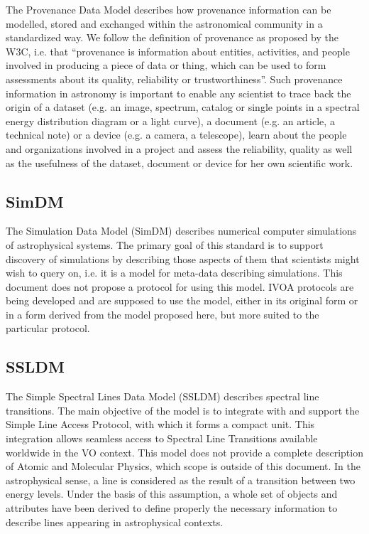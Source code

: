 \documentclass[11pt,letter]{ivoa}
\begin{document}
The Provenance Data Model \citep{2020ivoa.spec.0411S} describes how provenance information can be modelled, stored 
and exchanged within the astronomical community in a standardized way. We follow the 
definition of provenance as proposed by the W3C, i.e. that ``provenance is information 
about entities, activities, and people involved in producing a piece of data or thing, 
which can be used to form assessments about its quality, reliability or trustworthiness''.
Such provenance information in astronomy is important to enable any scientist to trace 
back the origin of a dataset (e.g. an image, spectrum, catalog or single points in a 
spectral energy distribution diagram or a light curve), a document (e.g. an article, a 
technical note) or a device (e.g. a camera, a telescope), learn about the people and 
organizations involved in a project and assess the reliability, quality as well as the 
usefulness of the dataset, document or device for her own scientific work. 

\subsection{SimDM}

The Simulation Data Model (SimDM) \citep{2012ivoa.spec.0503L} describes numerical computer simulations of astrophysical systems. 
The primary goal of this standard is to support discovery of simulations by describing those 
aspects of them that scientists might wish to query on, i.e. it is a model for meta-data 
describing simulations. This document does not propose a protocol for using this model. 
IVOA protocols are being developed and are supposed to use the model, either in its original 
form or in a form derived from the model proposed here, but more suited to the particular protocol. 

\subsection{SSLDM}

The Simple Spectral Lines Data Model (SSLDM) \citep{2010ivoa.spec.1209O} describes spectral line transitions. The main objective of 
the model is to integrate with and support the Simple Line Access Protocol, with which it forms 
a compact unit. This integration allows seamless access to Spectral Line Transitions available 
worldwide in the VO context. This model does not provide a complete description of Atomic and 
Molecular Physics, which scope is outside of this document. In the astrophysical sense, a line 
is considered as the result of a transition between two energy levels. Under the basis of this 
assumption, a whole set of objects and attributes have been derived to define properly the 
necessary information to describe lines appearing in astrophysical contexts.
\end{document}
